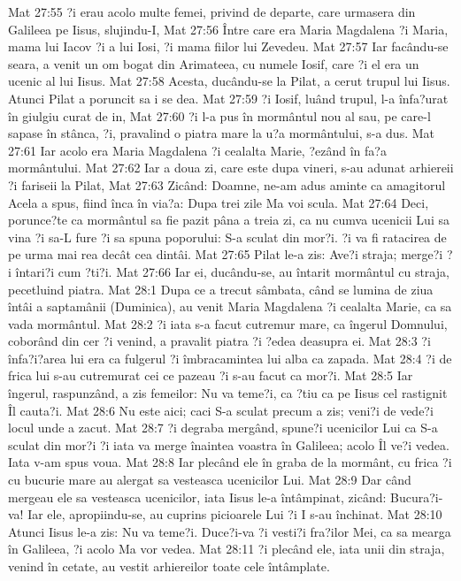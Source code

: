 Mat 27:55  ?i erau acolo multe femei, privind de departe, care urmasera din Galileea pe Iisus, slujindu-I,
Mat 27:56  Între care era Maria Magdalena ?i Maria, mama lui Iacov ?i a lui Iosi, ?i mama fiilor lui Zevedeu.
Mat 27:57  Iar facându-se seara, a venit un om bogat din Arimateea, cu numele Iosif, care ?i el era un ucenic al lui Iisus.
Mat 27:58  Acesta, ducându-se la Pilat, a cerut trupul lui Iisus. Atunci Pilat a poruncit sa i se dea.
Mat 27:59  ?i Iosif, luând trupul, l-a înfa?urat în giulgiu curat de in,
Mat 27:60  ?i l-a pus în mormântul nou al sau, pe care-l sapase în stânca, ?i, pravalind o piatra mare la u?a mormântului, s-a dus.
Mat 27:61  Iar acolo era Maria Magdalena ?i cealalta Marie, ?ezând în fa?a mormântului.
Mat 27:62  Iar a doua zi, care este dupa vineri, s-au adunat arhiereii ?i fariseii la Pilat,
Mat 27:63  Zicând: Doamne, ne-am adus aminte ca amagitorul Acela a spus, fiind înca în via?a: Dupa trei zile Ma voi scula.
Mat 27:64  Deci, porunce?te ca mormântul sa fie pazit pâna a treia zi, ca nu cumva ucenicii Lui sa vina ?i sa-L fure ?i sa spuna poporului: S-a sculat din mor?i. ?i va fi ratacirea de pe urma mai rea decât cea dintâi.
Mat 27:65  Pilat le-a zis: Ave?i straja; merge?i ?i întari?i cum ?ti?i.
Mat 27:66  Iar ei, ducându-se, au întarit mormântul cu straja, pecetluind piatra.
Mat 28:1  Dupa ce a trecut sâmbata, când se lumina de ziua întâi a saptamânii (Duminica), au venit Maria Magdalena ?i cealalta Marie, ca sa vada mormântul.
Mat 28:2  ?i iata s-a facut cutremur mare, ca îngerul Domnului, coborând din cer ?i venind, a pravalit piatra ?i ?edea deasupra ei.
Mat 28:3  ?i înfa?i?area lui era ca fulgerul ?i îmbracamintea lui alba ca zapada.
Mat 28:4  ?i de frica lui s-au cutremurat cei ce pazeau ?i s-au facut ca mor?i.
Mat 28:5  Iar îngerul, raspunzând, a zis femeilor: Nu va teme?i, ca ?tiu ca pe Iisus cel rastignit Îl cauta?i.
Mat 28:6  Nu este aici; caci S-a sculat precum a zis; veni?i de vede?i locul unde a zacut.
Mat 28:7  ?i degraba mergând, spune?i ucenicilor Lui ca S-a sculat din mor?i ?i iata va merge înaintea voastra în Galileea; acolo Îl ve?i vedea. Iata v-am spus voua.
Mat 28:8  Iar plecând ele în graba de la mormânt, cu frica ?i cu bucurie mare au alergat sa vesteasca ucenicilor Lui.
Mat 28:9  Dar când mergeau ele sa vesteasca ucenicilor, iata Iisus le-a întâmpinat, zicând: Bucura?i-va! Iar ele, apropiindu-se, au cuprins picioarele Lui ?i I s-au închinat.
Mat 28:10  Atunci Iisus le-a zis: Nu va teme?i. Duce?i-va ?i vesti?i fra?ilor Mei, ca sa mearga în Galileea, ?i acolo Ma vor vedea.
Mat 28:11  ?i plecând ele, iata unii din straja, venind în cetate, au vestit arhiereilor toate cele întâmplate.
